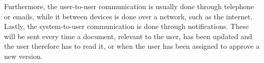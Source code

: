 Furthermore, the user-to-user communication is usually done through telephone or emails, while it between devices is done over a network, such as the internet.
Lastly, the system-to-user communication is done through notifications.
These will be sent every time a document, relevant to the user, has been updated and the user therefore has to read it, or when the user has been assigned to approve a new version.

